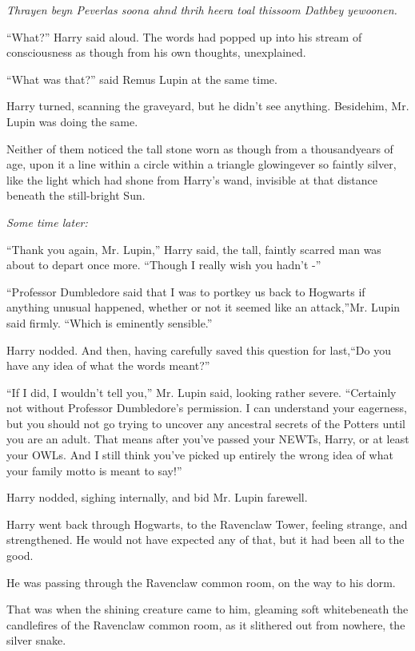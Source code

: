\emph{Thrayen beyn Peverlas soona ahnd thrih heera toal thissoom Dathbey yewoonen.}

“What?” Harry said aloud. The words had popped up into his stream of consciousness as though from his own thoughts, unexplained.

“What was that?” said Remus Lupin at the same time.

Harry turned, scanning the graveyard, but he didn't see anything. Besidehim, Mr. Lupin was doing the same.

Neither of them noticed the tall stone worn as though from a thousandyears of age, upon it a line within a circle within a triangle glowingever so faintly silver, like the light which had shone from Harry's wand, invisible at that distance beneath the still-bright Sun.

\replacement{\sbreak}{}

\emph{Some time later:}

“Thank you again, Mr. Lupin,” Harry said, the tall, faintly scarred man was about to depart once more. “Though I really wish you hadn't -”

“Professor Dumbledore said that I was to portkey us back to Hogwarts if anything unusual happened, whether or not it seemed like an attack,”Mr. Lupin said firmly. “Which is eminently sensible.”

Harry nodded. And then, having carefully saved this question for last,“Do you have any idea of what the words meant?”

“If I did, I wouldn't tell you,” Mr. Lupin said, looking rather severe. “Certainly not without Professor Dumbledore's permission. I can understand your eagerness, but you should not go trying to uncover any ancestral secrets of the Potters until you are an adult. That means after you've passed your NEWTs, Harry, or at least your OWLs. And I still think you've picked up entirely the wrong idea of what your family motto is meant to say!”

Harry nodded, sighing internally, and bid Mr. Lupin farewell.

\replacement{\sbreak}{}

Harry went back through Hogwarts, to the Ravenclaw Tower, feeling strange, and strengthened. He would not have expected any of that, but it had been all to the good.

He was passing through the Ravenclaw common room, on the way to his dorm.

That was when the shining creature came to him, gleaming soft whitebeneath the candlefires of the Ravenclaw common room, as it slithered out from nowhere, the silver snake.

